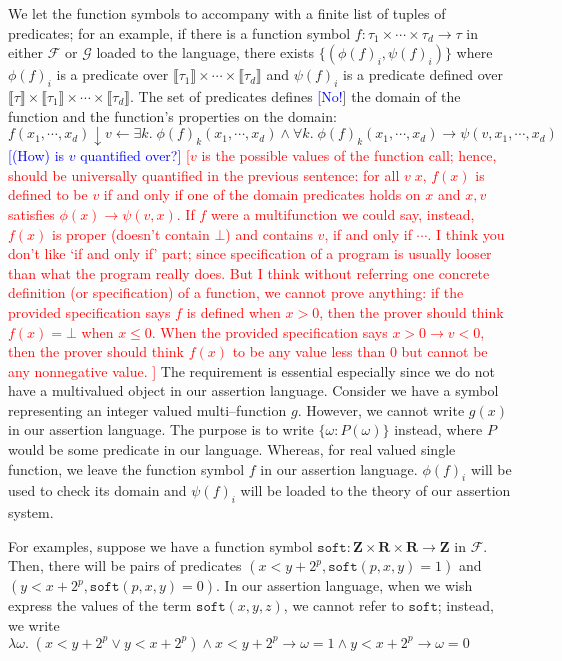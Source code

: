 \documentclass{article}
\newcommand{\Martin}[1]{\textcolor{blue}{#1}}
\newcommand{\Sewon}[1]{\textcolor{red}{#1}}
\newcommand{\dreal}{\textbf{R}}
\newcommand{\dint}{\textbf{Z}}
\newcommand{\sem}[1]{\llbracket #1 \rrbracket }
\begin{document}
We let the function symbols to accompany with
a finite list of tuples of predicates;
for an example, if there is a function symbol $f:\tau_1\times\cdots\times\tau_d\to\tau$ in either $\mathcal{F}$ or $\mathcal{G}$ loaded to the language,
there exists $\{(\phi(f)_i, \psi(f)_i)\}$ where $\phi(f)_i$ is a predicate over $\sem{\tau_1}\times\cdots\times\sem{\tau_d}$ and
$\psi(f)_i$ is a predicate defined over $\sem{\tau}\times\sem{\tau_1}\times\cdots\times\sem{\tau_d}$.
The set of predicates defines \Martin{[No!}] the domain of the function and the function's properties on the domain:
\[
f(x_1,\cdots, x_d) \downarrow v \leftarrow \exists k.\; \phi(f)_k(x_1,\cdots, x_d) \land \forall k.\;
\phi(f)_k(x_1,\cdots, x_d) \to
\psi(v, x_1, \cdots, x_d)
\]
\Martin{[(How) is $v$ quantified over?]}
\Sewon{[$v$ is the possible values of the function call;
hence, should be universally quantified in the previous sentence:
for all $v\;x$, $f(x)$ is defined to be $v$ if and only if
one of the domain predicates holds on $x$ and $x,v$ satisfies $\phi(x)\to\psi(v,x)$.
If $f$ were a multifunction we could say, instead, 
$f(x)$ is proper (doesn't contain $\bot$) and contains $v$, if and only if $\cdots$.
I think you don't like `if and only if' part; since specification of a program is usually looser than 
what the program really does. But I think without referring one concrete definition (or specification) of a function, 
we cannot prove anything:
if the provided specification says $f$ is defined when $x>0$, then the prover should think $f(x) = \bot$ when
$x \leq 0$. When the provided specification says $x>0 \to v<0$, then the prover should think 
$f(x)$ to be any value less than $0$ but cannot be any nonnegative value.
]
}
The requirement is essential especially since we do not have a multivalued object in our assertion language.
Consider we have a symbol representing an integer valued multi--function $g$.
However, we cannot write $g(x)$ in our assertion language.
The purpose is to write $\{\omega : P(\omega)\}$ instead, where $P$ would be some predicate
in our language.
Whereas, for real valued single function, we leave the function symbol $f$ in our assertion language.
$\phi(f)_i$ will be used to check its domain and $\psi(f)_i$  will be 
loaded to the theory of our assertion system.

For examples, suppose we have a function symbol
$\texttt{soft} :\dint \times \dreal \times \dreal \to \dint$ in $\mathcal{F}$. 
Then, there will be pairs of predicates $(x < y + 2^{p}, \texttt{soft}(p,x,y) =1)$
and $(y < x + 2^{p}, \texttt{soft}(p,x,y) =0)$. 
In our assertion language, 
when we wish express the values of the term $\texttt{soft}(x,y,z)$,
we cannot refer to $\texttt{soft}$;
 instead, 
we write $\lambda \omega.\; (x<y+2^{p}\lor y<x+2^{p}) \land x<y+2^{p} \to \omega = 1 \land y<x+2^{p} \to \omega = 0$
\end{document}
